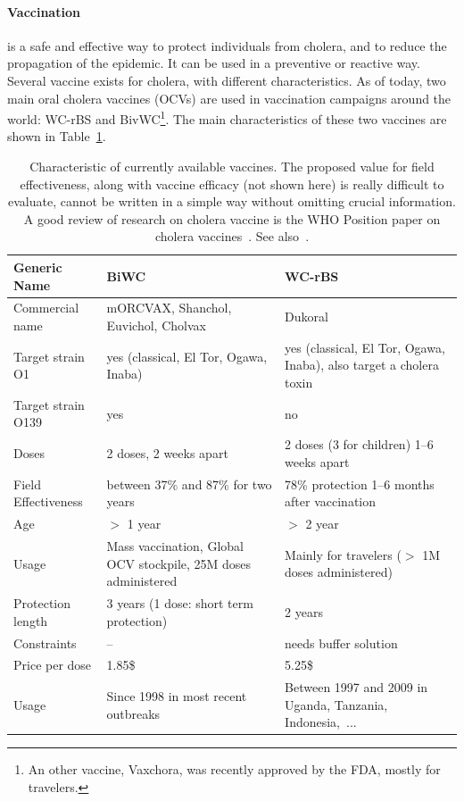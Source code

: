 \paragraph{Vaccination} is a safe and effective way to protect individuals from cholera, and to reduce the propagation of the epidemic. It can be used in a preventive or reactive way. Several vaccine exists for cholera, with different characteristics. As of today, two main oral cholera vaccines (OCVs) are used in vaccination campaigns around the world: WC-rBS and BivWC\footnote[][-10\baselineskip]{An other vaccine, Vaxchora, was recently approved by the FDA, mostly for travelers.}. The main characteristics of these two vaccines are shown in Table~\ref{tab:vacc}.

\begin{table}[h]
\centering\small
\label{tab:prior}
\begin{tabular}{lp{50mm}p{50mm}}
\toprule
Generic Name &  BiWC & WC-rBS\\ 
\midrule
Commercial name   &  mORCVAX, Shanchol,  Euvichol, Cholvax & Dukoral  \\
Target strain O1 &   yes (classical, El Tor, Ogawa, Inaba)& yes (classical, El Tor, Ogawa, Inaba), also  target a cholera toxin  \\
Target strain O139   &  yes &      no     \\
Doses   &  2 doses, 2 weeks apart & 2 doses (3 for children) 1--6 weeks apart  \\
Field Effectiveness  & between 37\% and 87\% for two years & 78\% protection 1--6 months after vaccination\\
Age   &  $>$ 1 year & $>$ 2 year      \\
Usage & Mass vaccination, Global OCV stockpile, 25M doses administered & Mainly for travelers ($>$ 1M doses administered)\\
Protection length & 3 years (1 dose: short term protection) & 2 years\\
Constraints & -- & needs buffer solution\\
Price per dose & 1.85\$ & 5.25\$ \\ 
Usage & Since 1998 in most recent outbreaks & Between 1997 and 2009 in Uganda, Tanzania, Indonesia,~... \\
\bottomrule
\end{tabular}
\caption{Characteristic of currently available vaccines. The proposed value for field effectiveness, along with vaccine efficacy (not shown here) is really difficult to evaluate, cannot be written in a simple way without omitting crucial information. A good review of research on cholera vaccine is the WHO Position paper on cholera vaccines~. See also~\parencite{WHO:BackgroundPaperWholeCell:2017,Azman:PopulationLevelEffectCholera:2016,Luquero:FirstOutbreakResponse:2013,WHO:BackgroundPaperIntegration:2009,Luquero:UseVibrioCholerae:2014,Qadri:EfficacySingledoseRegimen:2018,Bi:ProtectionCholeraKilled:2017,Azman:ImpactOneDoseTwoDose:2015,Tohme:OralCholeraVaccine:2015}.}
\label{tab:vacc}
\end{table}

